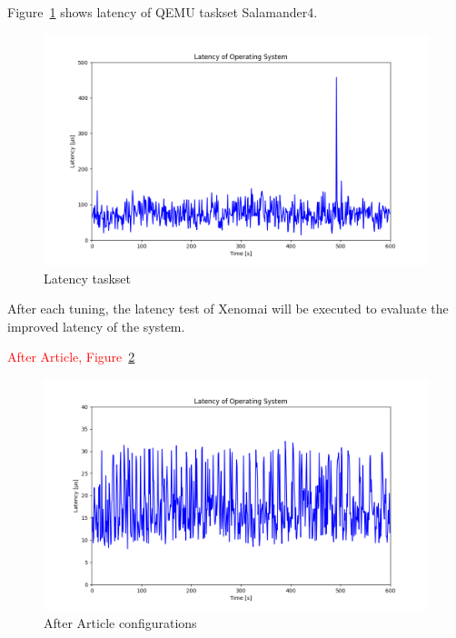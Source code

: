 \documentclass[MMR,Master,english]{twbook}
\begin{document}
Figure~\ref{fig:max_latency_taskset} shows latency of QEMU taskset Salamander4.
\begin{figure}[H]
	\centering
	\includegraphics[width=1.0\columnwidth]{img/max_latency_taskset.png}
	\caption[Latency taskset]{Latency taskset}
	\label{fig:max_latency_taskset}
\end{figure}


After each tuning, the latency test of Xenomai will be executed to evaluate the improved latency of the system.

\textcolor{red}{After Article, Figure~\ref{fig:max_latency_rt}}

\begin{figure}[H]
	\centering
	\includegraphics[width=1.0\columnwidth]{masterthesis-documentation/docs/sigmatek/xenomai/3rt/max_latency_rt/max_latency_rt.png}
	\caption[After Article configurations]{After Article configurations}
	\label{fig:max_latency_rt}
\end{figure}
\end{document}
